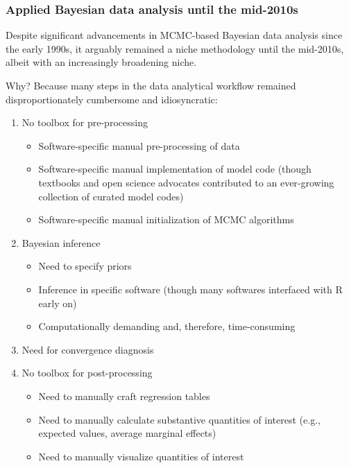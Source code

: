 \documentclass[
  11pt,
]{article}
\providecommand{\tightlist}{%
  \setlength{\itemsep}{0pt}\setlength{\parskip}{0pt}}
\begin{document}
\hypertarget{applied-bayesian-data-analysis-until-the-mid-2010s}{%
\subsubsection{Applied Bayesian data analysis until the mid-2010s}\label{applied-bayesian-data-analysis-until-the-mid-2010s}}

Despite significant advancements in MCMC-based Bayesian data analysis since the early 1990s, it arguably remained a niche methodology until the mid-2010s, albeit with an increasingly broadening niche.

Why? Because many steps in the data analytical workflow remained disproportionately cumbersome and idiosyncratic:

\begin{enumerate}
\def\labelenumi{\arabic{enumi}.}
\tightlist
\item
  No toolbox for pre-processing

  \begin{itemize}
  \tightlist
  \item
    Software-specific manual pre-processing of data
  \item
    Software-specific manual implementation of model code (though textbooks and open science advocates contributed to an ever-growing collection of curated model codes)
  \item
    Software-specific manual initialization of MCMC algorithms
  \end{itemize}
\item
  Bayesian inference

  \begin{itemize}
  \tightlist
  \item
    Need to specify priors
  \item
    Inference in specific software (though many softwares interfaced with R early on)
  \item
    Computationally demanding and, therefore, time-consuming
  \end{itemize}
\item
  Need for convergence diagnosis
\item
  No toolbox for post-processing

  \begin{itemize}
  \tightlist
  \item
    Need to manually craft regression tables
  \item
    Need to manually calculate substantive quantities of interest (e.g., expected values, average marginal effects)
  \item
    Need to manually visualize quantities of interest
  \end{itemize}
\end{enumerate}
\end{document}
